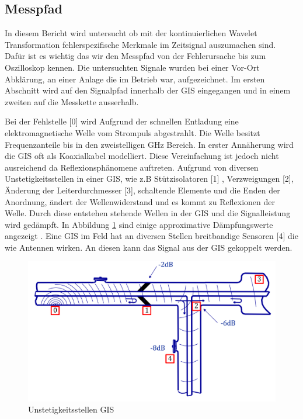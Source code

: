 \begin{refsection}
\section{Messpfad}
In diesem Bericht wird untersucht ob mit der kontinuierlichen Wavelet Transformation fehlerspezifische Merkmale im Zeitsignal auszumachen sind. 
Dafür ist es wichtig das wir den Messpfad von der Fehlerursache bis zum Oszilloskop kennen. 
Die untersuchten Signale wurden bei einer Vor-Ort Abklärung, an einer Anlage die im Betrieb war, aufgezeichnet.  
Im ersten Abschnitt wird auf den Signalpfad innerhalb der GIS eingegangen und in einem zweiten auf die Messkette ausserhalb.

Bei der Fehlstelle [0] wird Aufgrund der schnellen Entladung eine elektromagnetische  Welle vom Strompuls abgestrahlt. 
Die Welle besitzt Frequenzanteile bis in den zweistelligen GHz Bereich. 
In erster Annäherung wird die GIS oft als Koaxialkabel modelliert. 
Diese Vereinfachung ist jedoch nicht ausreichend da Reflexionsphänomene auftreten. 
Aufgrund von diversen Unstetigkeitsstellen in einer GIS, wie z.B Stützisolatoren [1] , Verzweigungen [2],  Änderung der Leiterdurchmesser [3], schaltende Elemente und die Enden der Anordnung, ändert der Wellenwiderstand und es kommt zu Reflexionen der Welle.
Durch diese entstehen stehende Wellen in der GIS und die Signalleistung wird gedämpft. 
In Abbildung \ref{fig:messketteingis} sind einige approximative Dämpfungswerte angezeigt \cite{report:PDBasicABB}.
Eine GIS im Feld hat an diversen Stellen breitbandige Sensoren [4] die wie Antennen wirken. 
An diesen kann das Signal aus der GIS gekoppelt werden. \cite{buch:UHFSignale, skript:Judd24ps, buch:Kuchler} 
\begin{figure}
	\centering
	\includegraphics[width=0.5\linewidth]{papers/gis/Bilder/MessketteInGIS}
	\caption{Unstetigkeitsstellen GIS \cite{report:PDBasicABB}}
	\label{fig:messketteingis}
\end{figure}


\end{refsection}
